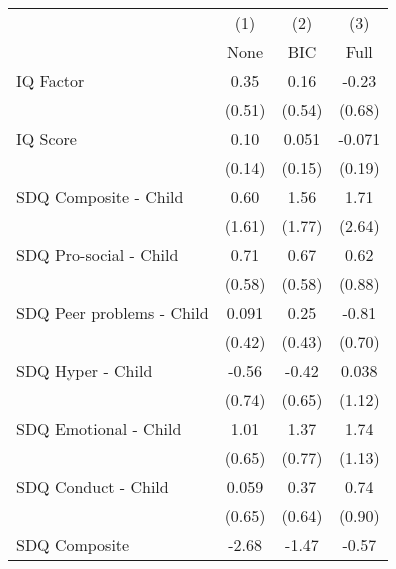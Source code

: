 {
\def\sym#1{\ifmmode^{#1}\else\(^{#1}\)\fi}
\begin{tabular}{l*{3}{c}}
\toprule
            &\multicolumn{1}{c}{(1)}&\multicolumn{1}{c}{(2)}&\multicolumn{1}{c}{(3)}\\
            &\multicolumn{1}{c}{None}&\multicolumn{1}{c}{BIC}&\multicolumn{1}{c}{Full}\\
\midrule
IQ Factor   &        0.35         &        0.16         &       -0.23         \\
            &      (0.51)         &      (0.54)         &      (0.68)         \\
\addlinespace
IQ Score    &        0.10         &       0.051         &      -0.071         \\
            &      (0.14)         &      (0.15)         &      (0.19)         \\
\addlinespace
SDQ Composite - Child&        0.60         &        1.56         &        1.71         \\
            &      (1.61)         &      (1.77)         &      (2.64)         \\
\addlinespace
SDQ Pro-social - Child&        0.71         &        0.67         &        0.62         \\
            &      (0.58)         &      (0.58)         &      (0.88)         \\
\addlinespace
SDQ Peer problems - Child&       0.091         &        0.25         &       -0.81         \\
            &      (0.42)         &      (0.43)         &      (0.70)         \\
\addlinespace
SDQ Hyper - Child&       -0.56         &       -0.42         &       0.038         \\
            &      (0.74)         &      (0.65)         &      (1.12)         \\
\addlinespace
SDQ Emotional - Child&        1.01         &        1.37         &        1.74         \\
            &      (0.65)         &      (0.77)         &      (1.13)         \\
\addlinespace
SDQ Conduct - Child&       0.059         &        0.37         &        0.74         \\
            &      (0.65)         &      (0.64)         &      (0.90)         \\
\addlinespace
SDQ Composite&       -2.68         &       -1.47         &       -0.57         \\

\end{tabular}}

